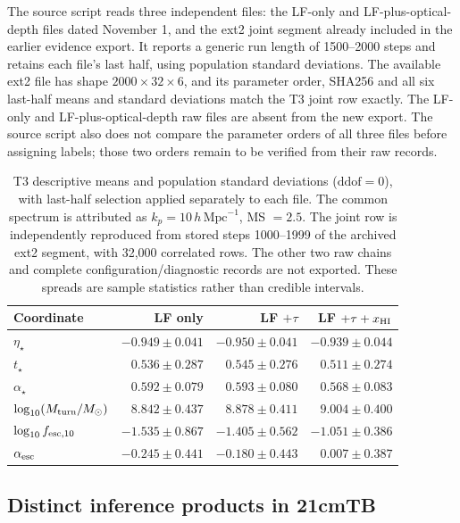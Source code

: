 The source script reads three independent files: the LF-only and LF-plus-optical-depth files dated November 1, and the ext2 joint segment already included in the earlier evidence export. It reports a generic run length of 1500--2000 steps and retains each file's last half, using population standard deviations. The available ext2 file has shape $2000\times32\times6$, and its parameter order, SHA256 and all six last-half means and standard deviations match the T3 joint row exactly. The LF-only and LF-plus-optical-depth raw files are absent from the new export. The source script also does not compare the parameter orders of all three files before assigning labels; those two orders remain to be verified from their raw records.

\begin{table}[t]\centering\small
\caption{T3 descriptive means and population standard deviations ($\mathrm{ddof}=0$), with last-half selection applied separately to each file. The common spectrum is attributed as $k_p=10\,h\,\mathrm{Mpc}^{-1}$, MS $=2.5$. The joint row is independently reproduced from stored steps 1000--1999 of the archived ext2 segment, with 32,000 correlated rows. The other two raw chains and complete configuration/diagnostic records are not exported. These spreads are sample statistics rather than credible intervals.}\label{tab:t3-obs-combinations}
\begin{tabular*}{\textwidth}{@{\extracolsep{\fill}}lrrr}\toprule
Coordinate & LF only & LF $+\tau$ & LF $+\tau+x_{\rm HI}$\\\midrule
$\eta_\star$ & $-0.949\pm0.041$ & $-0.950\pm0.041$ & $-0.939\pm0.044$\\
$t_\star$ & $0.536\pm0.287$ & $0.545\pm0.276$ & $0.511\pm0.274$\\
$\alpha_\star$ & $0.592\pm0.079$ & $0.593\pm0.080$ & $0.568\pm0.083$\\
$\log_{10}(M_{\rm turn}/M_\odot)$ & $8.842\pm0.437$ & $8.878\pm0.411$ & $9.004\pm0.400$\\
$\log_{10}f_{{\rm esc},10}$ & $-1.535\pm0.867$ & $-1.405\pm0.562$ & $-1.051\pm0.386$\\
$\alpha_{\rm esc}$ & $-0.245\pm0.441$ & $-0.180\pm0.443$ & $0.007\pm0.387$\\
\bottomrule\end{tabular*}\end{table}

\subsection{Distinct inference products in 21cmTB}\label{distinct-inference-products-in-21cmtb}

